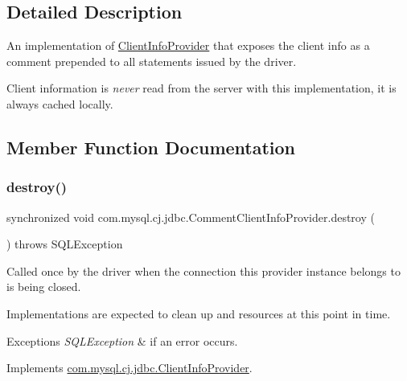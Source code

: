 \subsection{Detailed Description}
An implementation of \mbox{\hyperlink{interfacecom_1_1mysql_1_1cj_1_1jdbc_1_1_client_info_provider}{Client\+Info\+Provider}} that exposes the client info as a comment prepended to all statements issued by the driver.

Client information is {\itshape never} read from the server with this implementation, it is always cached locally. 

\subsection{Member Function Documentation}
\mbox{\label{classcom_1_1mysql_1_1cj_1_1jdbc_1_1_comment_client_info_provider_adc5904bfd14f15ad4976e4df42d004b7}} 
\subsubsection{\texorpdfstring{destroy()}{destroy()}}
{\footnotesize\ttfamily synchronized void com.\+mysql.\+cj.\+jdbc.\+Comment\+Client\+Info\+Provider.\+destroy (\begin{DoxyParamCaption}{ }\end{DoxyParamCaption}) throws S\+Q\+L\+Exception}

Called once by the driver when the connection this provider instance belongs to is being closed.

Implementations are expected to clean up and resources at this point in time.


\begin{DoxyExceptions}{Exceptions}
{\em S\+Q\+L\+Exception} & if an error occurs. \\
\hline
\end{DoxyExceptions}


Implements \mbox{\hyperlink{interfacecom_1_1mysql_1_1cj_1_1jdbc_1_1_client_info_provider_a994581557bab4982ec5699fa1114ef5a}{com.\+mysql.\+cj.\+jdbc.\+Client\+Info\+Provider}}.

